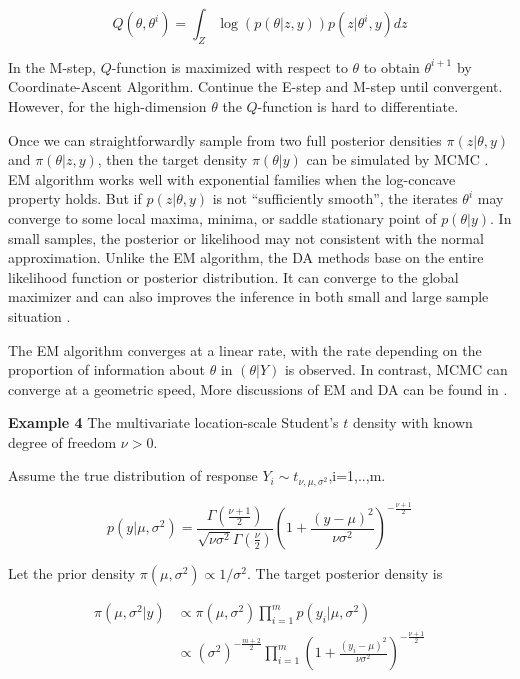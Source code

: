 \documentclass[12pt]{article}
\begin{document}
\[Q(\theta,\theta^{i})=\int_Z\log(p(\theta|z,y))p(z|\theta^{i},y)dz\]

In the M-step, \(Q\)-function is maximized with respect to \(\theta\) to
obtain \(\theta^{i+1}\) by Coordinate-Ascent Algorithm. Continue the
E-step and M-step until convergent. However, for the high-dimension
\(\theta\) the \(Q\)-function is hard to differentiate.

Once we can straightforwardly sample from two full posterior densities
\(\pi(z|\theta,y)\) and \(\pi(\theta|z,y)\), then the target density
\(\pi(\theta|y)\) can be simulated by MCMC
\citep{mengSeekingEfficientData1999}. EM algorithm works well with
exponential families when the log-concave property holds. But if
\(p(z|\theta,y)\) is not ``sufficiently smooth'', the iterates
\(\theta^{i}\) may converge to some local maxima, minima, or saddle
stationary point of \(p(\theta|y)\). In small samples, the posterior or
likelihood may not consistent with the normal approximation. Unlike the
EM algorithm, the DA methods base on the entire likelihood function or
posterior distribution. It can converge to the global maximizer and can
also improves the inference in both small and large sample situation
\citep{tannerToolsStatisticalInference1993}.

The EM algorithm converges at a linear
rate\citep{dempsterMaximumLikelihoodIncomplete1977}, with the rate
depending on the proportion of information about \(\theta\) in
\((\theta|Y)\) is observed. In contrast, MCMC can converge at a
geometric speed, More discussions of EM and DA can be found in
\citet{dykCrossFertilizingStrategiesBetter2010}.

\textbf{Example 4} The multivariate location-scale Student's \(t\)
density with known degree of freedom \(\nu>0\).

Assume the true distribution of response
\(Y_i\sim t_{\nu,\mu,\sigma^2}\),i=1,..,m.

\[p(y|\mu,\sigma^2)=\frac{\Gamma(\frac{\nu+1}2)}{\sqrt{\nu\sigma^2}\Gamma(\frac{\nu}2)}(1+\frac{(y-\mu)^2}{\nu\sigma^2})^{-\frac{\nu+1}2}\]

Let the prior density \(\pi(\mu,\sigma^2)\propto 1/\sigma^2\). The
target posterior density is

\[\begin{aligned}
\pi(\mu,\sigma^2|y)&\propto\pi(\mu,\sigma^2)\prod_{i=1}^m{p(y_i|\mu,\sigma^2)} \\
                   &\propto(\sigma^2)^{-\frac{m+2}2}\prod_{i=1}^m(1+\frac{(y_i-\mu)^2}{\nu\sigma^2})^{-\frac{\nu+1}2}
\end{aligned}\]
\end{document}
